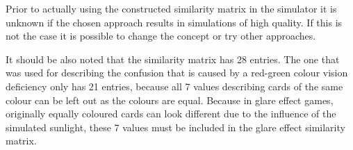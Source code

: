 Prior to actually using the constructed similarity matrix in the simulator it is unknown if the chosen approach results in simulations of high quality. If this is not the case it is possible to change the concept or try other approaches. 

It should be also noted that the similarity matrix has 28 entries. The one that was used for describing the confusion that is caused by a red-green colour vision deficiency only has 21 entries, because all 7 values describing cards of the same colour can be left out as the colours are equal. Because in glare effect games, originally equally coloured cards can look different due to the influence of the simulated sunlight, these 7 values must be included in the glare effect similarity matrix.

